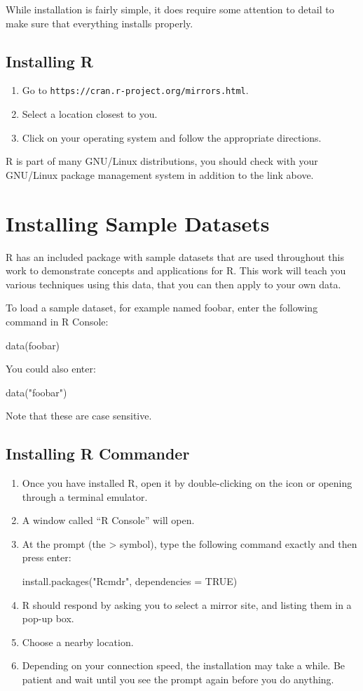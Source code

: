 While installation is fairly simple, it does require some attention to detail to make sure that everything installs properly.

\subsection{Installing R}
\begin{enumerate}
 \item Go to \texttt{https://cran.r-project.org/mirrors.html}.
 \item Select a location closest to you.
 \item Click on your operating system and follow the appropriate directions.
\end{enumerate}

R is part of many GNU/Linux distributions, you should check with your GNU/Linux package management system in addition to the link above.

\section{Installing Sample Datasets}
R has an included package with sample datasets that are used throughout this work to demonstrate concepts and applications for R. This work will teach you various techniques using this data, that you can then apply to your own data.

To load a sample dataset, for example named foobar, enter the following command in R Console:

data(foobar)

You could also enter:

data("foobar")

Note that these are case sensitive.

\subsection{Installing R Commander}
\begin{enumerate}
 \item Once you have installed R, open it by double-clicking on the icon or opening through a terminal emulator.
 \item A window called “R Console” will open.
 \item At the prompt (the > symbol), type the following command exactly and then press enter:

install.packages("Rcmdr", dependencies = TRUE)

 \item R should respond by asking you to select a mirror site, and listing them in a pop-up box.
 \item Choose a nearby location.
 \item Depending on your connection speed, the installation may take a while. Be patient and wait until you see the prompt again before you do anything.
 \end{enumerate}
 
